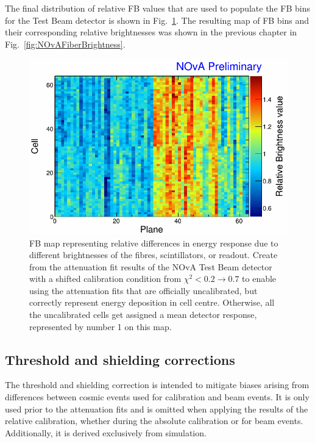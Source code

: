 The final distribution of relative \gls{FB} values that are used to populate the \gls{FB} bins for the Test Beam detector is shown in Fig.~\ref{fig:TBFiberBrightnessMap}. The resulting map of \gls{FB} bins and their corresponding relative brightnesses was shown in the previous chapter in Fig.~\ref{fig:NOvAFiberBrightness}.

\begin{figure}[hbtp]
\centering
\includegraphics[width=.8\textwidth]{Plots/TBCalibration/TBFiberBrightnessMap.png}
\caption[Fibre Brightness map for the Test Beam detector]{\acrshort{FB} map representing relative differences in energy response due to different brightnesses of the fibres, scintillators, or readout. Create from the attenuation fit results of the \acrshort{NOvA} Test Beam detector with a shifted calibration condition from $\chi^2<0.2\rightarrow 0.7$ to enable using the attenuation fits that are officially uncalibrated, but correctly represent energy deposition in cell centre. Otherwise, all the uncalibrated cells get assigned a mean detector response, represented by number 1 on this map.}
\label{fig:TBFiberBrightnessMap}
\end{figure}

\subsection{Threshold and shielding corrections}\label{sec:TBThresholdCorrection}
The threshold and shielding correction is intended to mitigate biases arising from differences between cosmic events used for calibration and beam events. It is only used prior to the attenuation fits and is omitted when applying the results of the relative calibration, whether during the absolute calibration or for beam events. Additionally, it is derived exclusively from simulation.

